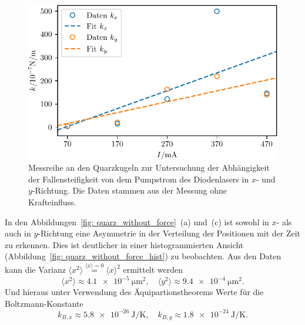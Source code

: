 \begin{figure}
  \centering
  \includegraphics[scale = 1]{../analysis/data/i_quarz/k_power_series.pdf}
  \caption{Messreihe an den Quarzkugeln zur Untersuchung der Abhängigkeit der Fallensteifigkeit von dem Pumpstrom des Diodenlasers
  in $x$- und $y$-Richtung. Die Daten stammen aus der Messung ohne Krafteinfluss. }
  \label{fig: quarz_k_power_series}
\end{figure}

In den Abbildungen~\ref{fig: quarz_without_force}~(a) und~(c) ist
sowohl in $x$- als auch in $y$-Richtung eine Asymmetrie in der Verteilung der Positionen mit der Zeit zu erkennen.
Dies ist deutlicher in einer histogrammierten Ansicht (Abbildung~\ref{fig: quarz_without_force_hist}) zu beobachten.
Aus den Daten kann die Varianz $\langle x^2 \rangle \overset{\langle x \rangle = 0} = \langle x\rangle^2$ ermittelt werden
\begin{equation}
  \langle x^2 \rangle \approx \SI{4.1e-5}{\micro\meter\squared},\quad \langle y^2 \rangle \approx \SI{9.4e-4}{\micro\meter\squared}.
\end{equation}
Und hieraus unter Verwendung des Äquipartionstheorems Werte für die Boltzmann-Konstante
\begin{equation}
k_{B, x} \approx \SI{5.8e-26}{\joule\per\kelvin}, \quad k_{B, y} \approx \SI{1.8e-24}{\joule\per\kelvin}.
\end{equation}


